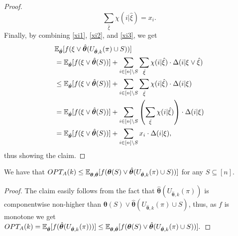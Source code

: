 \begin{proof}
\begin{equation}\label{xi3}
\sum_{\hat{\xi}}\chi(i|\hat{\xi})=x_i.
\end{equation}
Finally, by combining \eqref{xi1}, \eqref{xi2}, and \eqref{xi3}, we get
\begin{align*}
&\mathbb{E}_{\hat{\bm \theta}}[f(\xi\vee\hat{\bm \theta}(U_{\hat{\bm\theta},k}(\pi)\cup S))]\\
&=\mathbb{E}_{\hat{\bm \theta}}[f(\xi\vee\hat{\bm \theta}(S))]+\sum_{i\in [n]\setminus S}\sum_{\hat{\xi}}\chi(i|\hat{\xi})\cdot \Delta(i|\xi\vee \hat{\xi})\\
&\leq \mathbb{E}_{\hat{\bm \theta}}[f(\xi\vee\hat{\bm \theta}(S))]+\sum_{i\in [n]\setminus S}\sum_{\hat{\xi}}\chi(i|\hat{\xi})\cdot \Delta(i|\xi)\\
&=\mathbb{E}_{\hat{\bm \theta}}[f(\xi\vee\hat{\bm \theta}(S))]+\sum_{i\in [n]\setminus S}\left(\sum_{\hat{\xi}}\chi(i|\hat{\xi})\right)\cdot \Delta(i|\xi)\\
&=\mathbb{E}_{\hat{\bm \theta}}[f(\xi\vee\hat{\bm \theta}(S))]+\sum_{i\in [n]\setminus S}x_i\cdot \Delta(i|\xi),
\end{align*}
thus showing the claim. 
\end{proof}

\begin{lemma}\label{lemprel3}
We have that $OPT_A(k)\leq \mathbb{E}_{\bm\theta,\hat{\bm \theta}}[f(\bm\theta(S)\vee \hat{\bm \theta}(U_{\hat{\bm\theta},k}(\pi)\cup S))]$ for any $S\subseteq [n]$.
\end{lemma}

\begin{proof}
The claim easily follows from the fact that $\hat{\bm \theta}(U_{\hat{\bm\theta},k}(\pi))$ is componentwise non-higher than $\bm\theta(S)\vee \hat{\bm \theta}(U_{\hat{\bm\theta},k}(\pi)\cup S)$, thus, as $f$ is monotone we get $OPT_A(k)=\mathbb{E}_{\hat{\bm \theta}}[f(\hat{\bm \theta}(U_{\hat{\bm\theta},k}(\pi)))]\leq \mathbb{E}_{\bm\theta, \hat{\bm \theta}}[f(\bm\theta(S)\vee \hat{\bm \theta}(U_{\hat{\bm\theta},k}(\pi)\cup S))].$ 
\end{proof}

